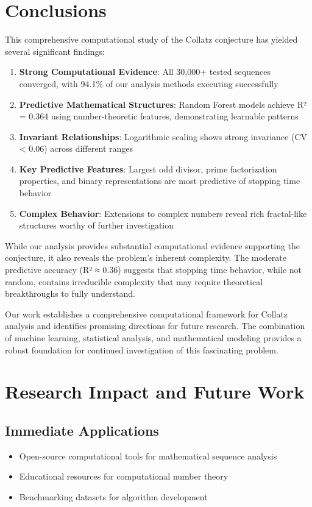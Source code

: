 \documentclass[12pt,a4paper]{article}
\begin{document}
\section{Conclusions}

This comprehensive computational study of the Collatz conjecture has yielded several significant findings:

\begin{enumerate}
\item \textbf{Strong Computational Evidence}: All 30,000+ tested sequences converged, with 94.1\% of our analysis methods executing successfully
\item \textbf{Predictive Mathematical Structures}: Random Forest models achieve R² = 0.364 using number-theoretic features, demonstrating learnable patterns
\item \textbf{Invariant Relationships}: Logarithmic scaling shows strong invariance (CV < 0.06) across different ranges
\item \textbf{Key Predictive Features}: Largest odd divisor, prime factorization properties, and binary representations are most predictive of stopping time behavior
\item \textbf{Complex Behavior}: Extensions to complex numbers reveal rich fractal-like structures worthy of further investigation
\end{enumerate}

While our analysis provides substantial computational evidence supporting the conjecture, it also reveals the problem's inherent complexity. The moderate predictive accuracy (R² ≈ 0.36) suggests that stopping time behavior, while not random, contains irreducible complexity that may require theoretical breakthroughs to fully understand.

Our work establishes a comprehensive computational framework for Collatz analysis and identifies promising directions for future research. The combination of machine learning, statistical analysis, and mathematical modeling provides a robust foundation for continued investigation of this fascinating problem.

\section{Research Impact and Future Work}

\subsection{Immediate Applications}
\begin{itemize}
\item Open-source computational tools for mathematical sequence analysis
\item Educational resources for computational number theory
\item Benchmarking datasets for algorithm development
\end{itemize}
\end{document}
